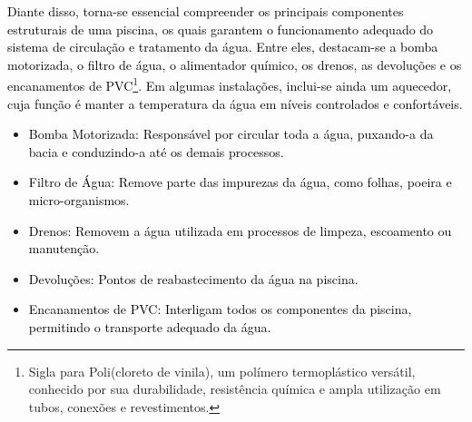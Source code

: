         \textcolor{black}{Diante disso, torna-se essencial compreender os principais componentes estruturais de uma piscina, os quais garantem o funcionamento adequado do sistema de circulação e tratamento da água. Entre eles, destacam-se a bomba motorizada, o filtro de água, o alimentador químico, os drenos, as devoluções e os encanamentos de PVC\footnote{Sigla para Poli(cloreto de vinila), um polímero termoplástico versátil, conhecido por sua durabilidade, resistência química e ampla utilização em tubos, conexões e revestimentos.}. Em algumas instalações, inclui-se ainda um aquecedor, cuja função é manter a temperatura da água em níveis controlados e confortáveis.}

        \begin{itemize}
        
            \item \textcolor{black}{Bomba Motorizada:}
                \textcolor{black}{Responsável por circular toda a água, puxando-a da bacia e conduzindo-a até os demais processos.}

            \item \textcolor{black}{Filtro de Água:}
                \textcolor{black}{Remove parte das impurezas da água, como folhas, poeira e micro-organismos.}


            \item \textcolor{black}{Drenos:}
                \textcolor{black}{Removem a água utilizada em processos de limpeza, escoamento ou manutenção.}

            \item \textcolor{black}{Devoluções:}
                \textcolor{black}{Pontos de reabastecimento da água na piscina.}

            \item \textcolor{black}{Encanamentos de PVC:}
                \textcolor{black}{Interligam todos os componentes da piscina, permitindo o transporte adequado da água.}
                
        \end{itemize}

